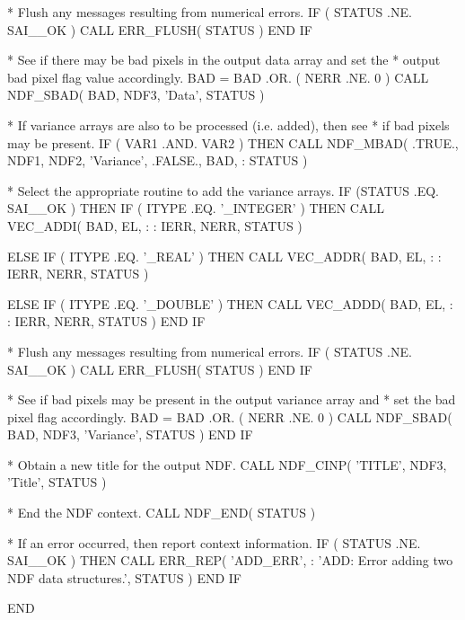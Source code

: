 \documentclass[twoside,11pt,nolof]{starlink}
\begin{document}
\begin{terminalv}
*  Flush any messages resulting from numerical errors.
         IF ( STATUS .NE. SAI__OK ) CALL ERR_FLUSH( STATUS )
      END IF

*  See if there may be bad pixels in the output data array and set the
*  output bad pixel flag value accordingly.
      BAD = BAD .OR. ( NERR .NE. 0 )
      CALL NDF_SBAD( BAD, NDF3, 'Data', STATUS )

*  If variance arrays are also to be processed (i.e. added), then see
*  if bad pixels may be present.
      IF ( VAR1 .AND. VAR2 ) THEN
         CALL NDF_MBAD( .TRUE., NDF1, NDF2, 'Variance', .FALSE., BAD,
     :                  STATUS )

*  Select the appropriate routine to add the variance arrays.
         IF (STATUS .EQ. SAI__OK ) THEN
            IF ( ITYPE .EQ. '_INTEGER' ) THEN
               CALL VEC_ADDI( BAD, EL, %
     :                        %
     :                        IERR, NERR, STATUS )

            ELSE IF ( ITYPE .EQ. '_REAL' ) THEN
               CALL VEC_ADDR( BAD, EL, %
     :                        %
     :                        IERR, NERR, STATUS )

            ELSE IF ( ITYPE .EQ. '_DOUBLE' ) THEN
               CALL VEC_ADDD( BAD, EL, %
     :                        %
     :                        IERR, NERR, STATUS )
            END IF

*  Flush any messages resulting from numerical errors.
            IF ( STATUS .NE. SAI__OK ) CALL ERR_FLUSH( STATUS )
         END IF

*  See if bad pixels may be present in the output variance array and
*  set the bad pixel flag accordingly.
         BAD = BAD .OR. ( NERR .NE. 0 )
         CALL NDF_SBAD( BAD, NDF3, 'Variance', STATUS )
      END IF

*  Obtain a new title for the output NDF.
      CALL NDF_CINP( 'TITLE', NDF3, 'Title', STATUS )

*  End the NDF context.
      CALL NDF_END( STATUS )

*  If an error occurred, then report context information.
      IF ( STATUS .NE. SAI__OK ) THEN
         CALL ERR_REP( 'ADD_ERR',
     :   'ADD: Error adding two NDF data structures.', STATUS )
      END IF

      END
\end{terminalv}
\normalsize
\end{document}
